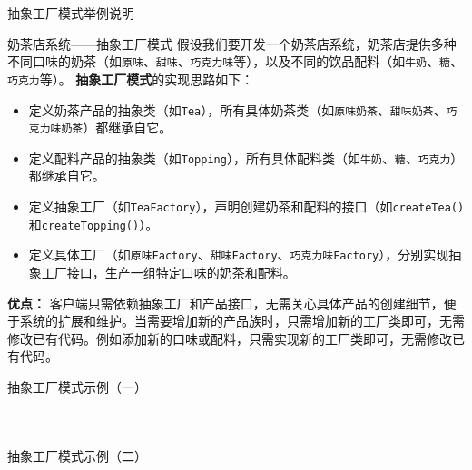 \documentclass[UTF8,aspectratio=169]{beamer}
\begin{document}
\begin{frame}{抽象工厂模式举例说明}
    \begin{exampleytublock}{奶茶店系统——抽象工厂模式}
        假设我们要开发一个奶茶店系统，奶茶店提供多种不同口味的奶茶（如\texttt{原味}、\texttt{甜味}、\texttt{巧克力味}等），以及不同的饮品配料（如\texttt{牛奶}、\texttt{糖}、\texttt{巧克力}等）。
        \textbf{抽象工厂模式}的实现思路如下：
        \begin{itemize}
            \item 定义奶茶产品的抽象类（如\texttt{Tea}），所有具体奶茶类（如\texttt{原味奶茶}、\texttt{甜味奶茶}、\texttt{巧克力味奶茶}）都继承自它。
            \item 定义配料产品的抽象类（如\texttt{Topping}），所有具体配料类（如\texttt{牛奶}、\texttt{糖}、\texttt{巧克力}）都继承自它。
            \item 定义抽象工厂（如\texttt{TeaFactory}），声明创建奶茶和配料的接口（如\texttt{createTea()}和\texttt{createTopping()}）。
            \item 定义具体工厂（如\texttt{原味Factory}、\texttt{甜味Factory}、\texttt{巧克力味Factory}），分别实现抽象工厂接口，生产一组特定口味的奶茶和配料。
        \end{itemize}
        \textbf{优点：} 客户端只需依赖抽象工厂和产品接口，无需关心具体产品的创建细节，便于系统的扩展和维护。当需要增加新的产品族时，只需增加新的工厂类即可，无需修改已有代码。例如添加新的口味或配料，只需实现新的工厂类即可，无需修改已有代码。
    \end{exampleytublock}
\end{frame}

\begin{frame}{抽象工厂模式示例（一）}
    \begin{columns}
        \begin{column}{0.48\textwidth}
            \inputminted[firstline=1, lastline=19]{cpp}{code/abstract_factory_pattern.cpp}
        \end{column}
        \begin{column}{0.48\textwidth}
            \inputminted[firstline=21, lastline=41]{cpp}{code/abstract_factory_pattern.cpp}
        \end{column}
    \end{columns}
\end{frame}

\begin{frame}{抽象工厂模式示例（二）}
    \begin{columns}
        \begin{column}{0.48\textwidth}
            \inputminted[firstline=43, lastline=63]{cpp}{code/abstract_factory_pattern.cpp}
        \end{column}
        \begin{column}{0.48\textwidth}
            \inputminted[firstline=65, lastline=81]{cpp}{code/abstract_factory_pattern.cpp}
        \end{column}
    \end{columns}
\end{frame}
\end{document}
